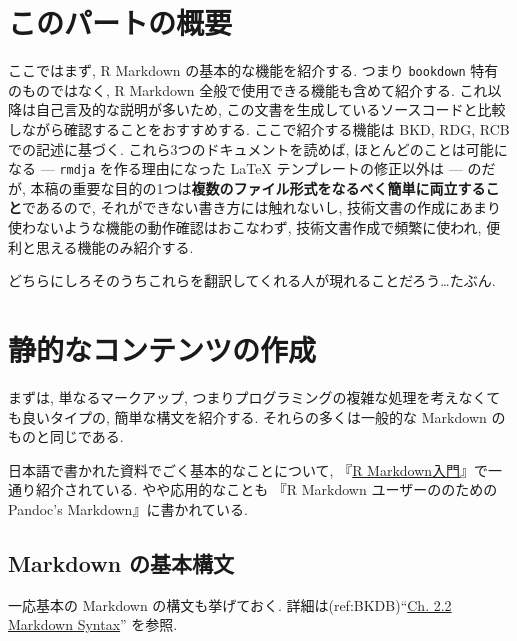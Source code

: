 \documentclass[
  xelatex,ja=standard,jafont=noto]{bxjsbook}
\theoremstyle{definition}
\theoremstyle{definition}
\theoremstyle{definition}
\theoremstyle{definition}
\theoremstyle{remark}
\begin{document}
\hypertarget{ux3053ux306eux30d1ux30fcux30c8ux306eux6982ux8981}{%
\chapter*{このパートの概要}\label{ux3053ux306eux30d1ux30fcux30c8ux306eux6982ux8981}}

ここではまず, R Markdown の基本的な機能を紹介する. つまり
\texttt{bookdown} 特有のものではなく, R Markdown
全般で使用できる機能も含めて紹介する.
これ以降は自己言及的な説明が多いため,
この文書を生成しているソースコードと比較しながら確認することをおすすめする.
ここで紹介する機能は BKD, RDG, RCB での記述に基づく.
これら3つのドキュメントを読めば, ほとんどのことは可能になる ---
\texttt{rmdja} を作る理由になった LaTeX テンプレートの修正以外は ---
のだが,
本稿の重要な目的の1つは\textbf{複数のファイル形式をなるべく簡単に両立すること}であるので,
それができない書き方には触れないし,
技術文書の作成にあまり使わないような機能の動作確認はおこなわず,
技術文書作成で頻繁に使われ, 便利と思える機能のみ紹介する.

どちらにしろそのうちこれらを翻訳してくれる人が現れることだろう\ldots たぶん.

\hypertarget{ux9759ux7684ux306aux30b3ux30f3ux30c6ux30f3ux30c4ux306eux4f5cux6210}{%
\chapter{静的なコンテンツの作成}\label{ux9759ux7684ux306aux30b3ux30f3ux30c6ux30f3ux30c4ux306eux4f5cux6210}}

まずは, 単なるマークアップ,
つまりプログラミングの複雑な処理を考えなくても良いタイプの,
簡単な構文を紹介する. それらの多くは一般的な Markdown
のものと同じである.

日本語で書かれた資料でごく基本的なことについて,
『\href{https://kazutan.github.io/kazutanR/Rmd_intro.html}{R
Markdown入門}』で一通り紹介されている. やや応用的なことも 『R Markdown
ユーザーののための Pandoc's Markdown』に書かれている.

\hypertarget{markdown-ux306eux57faux672cux69cbux6587}{%
\section{Markdown
の基本構文}\label{markdown-ux306eux57faux672cux69cbux6587}}

一応基本の Markdown の構文も挙げておく.
詳細は(ref:BKDB)``\href{https://bookdown.org/yihui/bookdown/markdown-syntax.html}{Ch.
2.2 Markdown Syntax}'' を参照.
\end{document}
